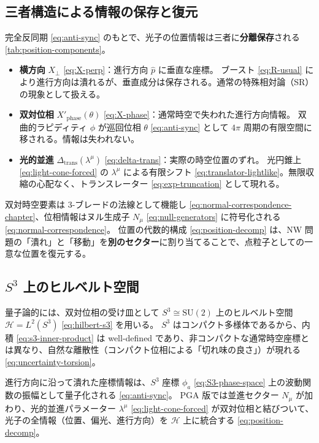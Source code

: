\documentclass[dvipdfmx,a4paper,oneside]{jsbook}
\numberwithin{equation}{chapter}
\begin{document}
\subsection{三者構造による情報の保存と復元}

完全反同期 \eqref{eq:anti-sync} のもとで、光子の位置情報は三者に\textbf{分離保存}される \eqref{tab:position-components}。

\begin{itemize}[leftmargin=2em]
  \item \textbf{横方向} \(X_\perp\) \eqref{eq:X-perp}：進行方向 \(\hat{p}\) に垂直な座標。
  ブースト \eqref{eq:R-usual} により進行方向は潰れるが、垂直成分は保存される。通常の特殊相対論（SR）の現象として扱える。
  \item \textbf{双対位相} \(X'_{\mathrm{phase}}(\theta)\) \eqref{eq:X-phase}：通常時空で失われた進行方向情報。
  双曲的ラピディティ \(\phi\) が巡回位相 \(\theta\) \eqref{eq:anti-sync} として \(4\pi\) 周期の有限空間に移される。情報は失われない。
  \item \textbf{光的並進} \(\Delta_{\mathrm{trans}}(\lambda^\mu)\) \eqref{eq:delta-trans}：実際の時空位置のずれ。
  光円錐上 \eqref{eq:light-cone-forced} の \(\lambda^\mu\) による有限シフト \eqref{eq:translator-lightlike}。無限収縮の心配なく、トランスレーター \eqref{eq:exp-truncation} として現れる。
\end{itemize}

双対時空要素は 3-ブレードの法線として機能し \eqref{eq:normal-correspondence-chapter}、位相情報はヌル生成子 \(N_\mu\) \eqref{eq:null-generators} に符号化される \eqref{eq:normal-correspondence}。
位置の代数的構成 \eqref{eq:position-decomp} は、NW 問題の「潰れ」と「移動」を\textbf{別のセクター}に割り当てることで、点粒子としての一意な位置を復元する。

\subsection{\texorpdfstring{\(S^3\) 上のヒルベルト空間}{S3 上のヒルベルト空間}}

量子論的には、双対位相の受け皿として \(S^3 \cong \mathrm{SU}(2)\) 上のヒルベルト空間 \(\mathcal{H} = L^2(S^3)\) \eqref{eq:hilbert-s3} を用いる。
\(S^3\) はコンパクト多様体であるから、内積 \eqref{eq:s3-inner-product} は well-defined であり、非コンパクトな通常時空座標とは異なり、自然な離散性（コンパクト位相による「切れ味の良さ」）が現れる \eqref{eq:uncertainty-torsion}。

進行方向に沿って潰れた座標情報は、\(S^3\) 座標 \(\phi_a\) \eqref{eq:S3-phase-space} 上の波動関数の振幅として量子化される \eqref{eq:anti-sync}。
PGA 版では並進セクター \(N_\mu\) が加わり、光的並進パラメーター \(\lambda^\mu\) \eqref{eq:light-cone-forced} が双対位相と結びついて、光子の全情報（位置、偏光、進行方向）を \(\mathcal{H}\) 上に統合する \eqref{eq:position-decomp}。
\end{document}
